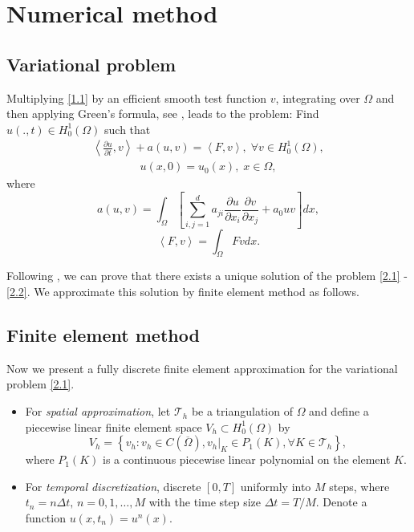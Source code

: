 \documentclass[twocolumn]{article}
\begin{document}
\section{Numerical method} 
\subsection{Variational problem}
\quad Multiplying \eqref{1.1} by an efficient smooth test function $v$, integrating over $\Omega$ and then applying Green's formula, see \cite{F05}, leads to the problem: Find $u(.,t)\in H^1_0(\Omega)$ such that
\begin{align}\label{2.1}
	\left\langle \frac{\partial u}{\partial t}, v \right\rangle+a\left(u, v\right)=\left\langle F, v \right\rangle,\; \forall v\in H^1_0(\Omega),
\end{align} 
\begin{align}\label{2.2}
	u(x, 0)=u_0(x), \; x\in \Omega,
\end{align}
where 
$$a\left(u, v\right)=\int_{\Omega}\left[\sum_{i, j=1}^{d}a_{ji}\frac{\partial u}{\partial x_i}\frac{\partial v}{\partial x_j}+a_0uv\right]dx,$$
$$\left\langle F, v \right\rangle=\int_{\Omega}F vdx.$$

Following \cite{L98, W87, C87, SV03}, we can prove that there exists a unique solution of the problem \eqref{2.1} - \eqref{2.2}. We approximate this solution by finite element method as follows. 
\subsection{Finite element method}
\quad Now we present a fully discrete finite element approximation for the variational problem \eqref{2.1}.
\begin{itemize}
	\item For \textit{spatial approximation}, let $\mathcal{T}_h$ be a triangulation of $\Omega$ and define a piecewise linear finite element space $V_h \subset H^1_0(\Omega)$ by
	$$V_h=\left\{v_h:v_h\in C(\overline{\Omega}), v_h|_K\in P_1(K), \forall K\in \mathcal{T}_h\right\},$$
	where $P_1(K)$ is a continuous piecewise linear polynomial on the element $K$.
	\item For \textit{temporal discretization}, discrete $[0, T]$ uniformly into $M$ steps, where $t_n=n\Delta t,\, n=0, 1, \dots, M$ with the time step size $\Delta t = T/M$. Denote a function $u(x, t_n)=u^n(x)$.
\end{itemize}
\end{document}
